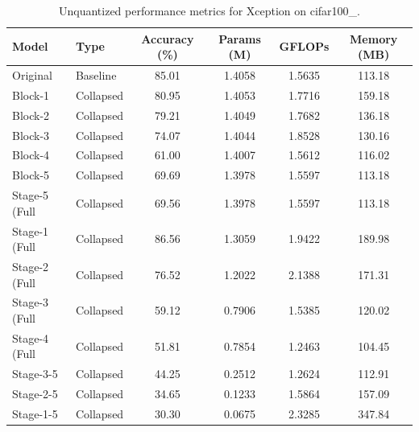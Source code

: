 \begin{table}
\caption{Unquantized performance metrics for Xception on cifar100_.}
\label{tab:Xception_cifar100__unquant}
\begin{tabular}{llcccc}
\toprule
Model & Type & Accuracy (\%) & Params (M) & GFLOPs & Memory (MB) \\
\midrule
Original & Baseline & 85.01 & 1.4058 & 1.5635 & 113.18 \\
Block-1 & Collapsed & 80.95 & 1.4053 & 1.7716 & 159.18 \\
Block-2 & Collapsed & 79.21 & 1.4049 & 1.7682 & 136.18 \\
Block-3 & Collapsed & 74.07 & 1.4044 & 1.8528 & 130.16 \\
Block-4 & Collapsed & 61.00 & 1.4007 & 1.5612 & 116.02 \\
Block-5 & Collapsed & 69.69 & 1.3978 & 1.5597 & 113.18 \\
Stage-5 (Full & Collapsed & 69.56 & 1.3978 & 1.5597 & 113.18 \\
Stage-1 (Full & Collapsed & 86.56 & 1.3059 & 1.9422 & 189.98 \\
Stage-2 (Full & Collapsed & 76.52 & 1.2022 & 2.1388 & 171.31 \\
Stage-3 (Full & Collapsed & 59.12 & 0.7906 & 1.5385 & 120.02 \\
Stage-4 (Full & Collapsed & 51.81 & 0.7854 & 1.2463 & 104.45 \\
Stage-3-5 & Collapsed & 44.25 & 0.2512 & 1.2624 & 112.91 \\
Stage-2-5 & Collapsed & 34.65 & 0.1233 & 1.5864 & 157.09 \\
Stage-1-5 & Collapsed & 30.30 & 0.0675 & 2.3285 & 347.84 \\
\bottomrule
\end{tabular}
\end{table}
